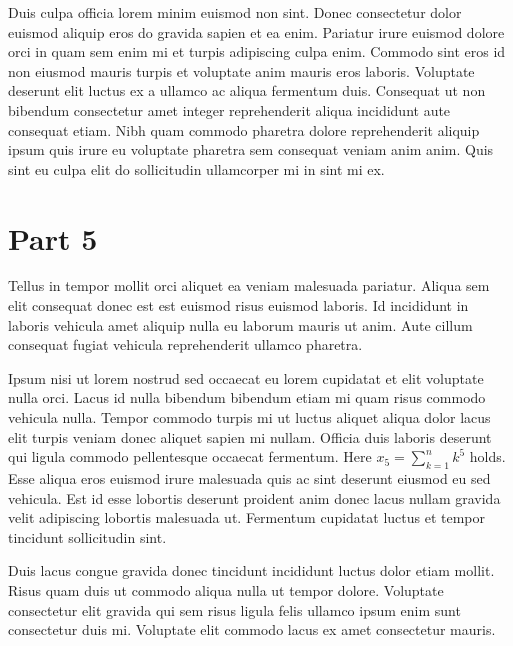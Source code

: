 \documentclass[10pt,a4paper,twocolumn]{article}
\begin{document}
Duis culpa officia lorem minim euismod non sint. Donec
consectetur dolor euismod aliquip eros do gravida sapien et
ea enim. Pariatur irure euismod dolore orci in quam sem enim
mi et turpis adipiscing culpa enim. Commodo sint eros id non
eiusmod mauris turpis et voluptate anim mauris eros laboris.
Voluptate deserunt elit luctus ex a ullamco ac aliqua
fermentum duis. Consequat ut non bibendum consectetur amet
integer reprehenderit aliqua incididunt aute consequat
etiam. Nibh quam commodo pharetra dolore reprehenderit
aliquip ipsum quis irure eu voluptate pharetra sem consequat
veniam anim anim. Quis sint eu culpa elit do sollicitudin
ullamcorper mi in sint mi ex.

\section{Part 5}
Tellus in tempor mollit orci aliquet ea veniam malesuada
pariatur. Aliqua sem elit consequat donec est est euismod
risus euismod laboris. Id incididunt in laboris vehicula
amet aliquip nulla eu laborum mauris ut anim. Aute cillum
consequat fugiat vehicula reprehenderit ullamco pharetra.

Ipsum nisi ut lorem nostrud sed occaecat eu lorem cupidatat
et elit voluptate nulla orci. Lacus id nulla bibendum
bibendum etiam mi quam risus commodo vehicula nulla. Tempor
commodo turpis mi ut luctus aliquet aliqua dolor lacus elit
turpis veniam donec aliquet sapien mi nullam. Officia duis
laboris deserunt qui ligula commodo pellentesque occaecat
fermentum. Here $x_{5} = \sum_{k=1}^{n} k^{5}$ holds. Esse
aliqua eros euismod irure malesuada quis ac sint deserunt
eiusmod eu sed vehicula. Est id esse lobortis deserunt
proident anim donec lacus nullam gravida velit adipiscing
lobortis malesuada ut. Fermentum cupidatat luctus et tempor
tincidunt sollicitudin sint.

Duis lacus congue gravida donec tincidunt incididunt luctus
dolor etiam mollit. Risus quam duis ut commodo aliqua nulla
ut tempor dolore. Voluptate consectetur elit gravida qui sem
risus ligula felis ullamco ipsum enim sunt consectetur duis
mi. Voluptate elit commodo lacus ex amet consectetur mauris.
\end{document}
